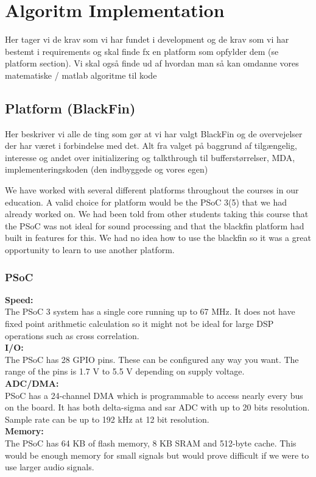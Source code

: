 \chapter{Algoritm Implementation}
Her tager vi de krav som vi har fundet i development og de krav som vi har bestemt i requirements og skal finde fx en platform som opfylder dem (se platform section). Vi skal også finde ud af hvordan man så kan omdanne vores matematiske / matlab algoritme til kode

\section{Platform (BlackFin)}
Her beskriver vi alle de ting som gør at vi har valgt BlackFin og de overvejelser der har været i forbindelse med det. Alt fra valget på baggrund af tilgængelig, interesse og andet over initializering og talkthrough til bufferstørrelser, MDA, implementeringskoden (den indbyggede og vores egen)

We have worked with several different platforms throughout the courses in our education. A valid choice for platform would be the PSoC 3(5) that we had already worked on. We had been told from other students taking this course that the PSoC was not ideal for sound processing and that the blackfin platform had built in features for this. We had no idea how to use the blackfin so it was a great opportunity to learn to use another platform. 
\subsection{PSoC}
\textbf{Speed:}\\
The PSoC 3 system has a single core running up to 67 MHz. It does not have fixed point arithmetic calculation so it might not be ideal for large DSP operations such as cross correlation. \\
\textbf{I/O:}\\
The PSoC has 28 GPIO pins. These can be configured any way you want. The range of the pins is 1.7 V to 5.5 V depending on supply voltage. \\
\textbf{ADC/DMA:}\\
PSoC has a 24-channel DMA which is programmable to access nearly every bus on the board. It has both delta-sigma and sar ADC with up to 20 bits resolution. Sample rate can be up to 192 kHz at 12 bit resolution. \\
\textbf{Memory:}\\
The PSoC has 64 KB of flash memory, 8 KB SRAM and 512-byte cache. This would be enough memory for small signals but would prove difficult if we were to use larger audio signals.\\
